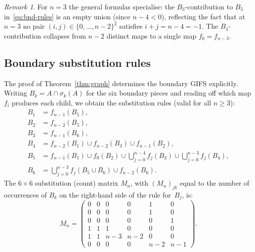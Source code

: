 \documentclass{amsart}
\theoremstyle{definition}
\theoremstyle{remark}
\newtheorem{remark}[theorem]{Remark}
\begin{document}
\begin{remark}
For $n = 3$ the general formulas specialise: the $B_3$-contribution
to $B_5$ in~\eqref{eq:bnd-rules} is an empty union (since
$n - 4 < 0$), reflecting the fact that at $n = 3$ no pair
$(i,j) \in \{0,\ldots,n{-}2\}^2$ satisfies $i + j = n{-}4 = -1$.
The $B_4$-contribution collapses from $n{-}2$ distinct maps to a
single map $f_0 = f_{n-3}$.
\end{remark}

\subsection{Boundary substitution rules}

The proof of Theorem~\ref{thm:graph} determines the boundary GIFS
explicitly.  Writing $B_k = A \cap \sigma_k(A)$ for the six
boundary pieces and reading off which map $f_i$ produces each
child, we obtain the substitution rules (valid for all $n \ge 3$):
\begin{equation}\label{eq:bnd-rules}
\begin{aligned}
  B_1 &= f_{n-1}(B_5), \\
  B_2 &= f_{n-2}(B_5), \\
  B_3 &= f_{n-1}(B_6), \\
  B_4 &= f_{n-2}(B_1) \cup f_{n-2}(B_3) \cup f_{n-1}(B_2), \\
  B_5 &= f_{n-1}(B_1) \cup f_0(B_2)
    \cup \bigcup_{j=0}^{n-4} f_j(B_3)
    \cup \bigcup_{j=0}^{n-3} f_j(B_4), \\
  B_6 &= \bigcup_{j=0}^{n-3} f_j(B_5 \cup B_6) \cup f_{n-2}(B_6).
\end{aligned}
\end{equation}
The $6 \times 6$ substitution (count) matrix $M_n$, with $(M_n)_{jk}$
equal to the number of occurrences of $B_k$ on the right-hand side of
the rule for~$B_j$, is:
\begin{equation}\label{eq:subst-matrix}
  M_n =
  \begin{pmatrix}
    0 & 0 & 0 & 0 & 1 & 0 \\
    0 & 0 & 0 & 0 & 1 & 0 \\
    0 & 0 & 0 & 0 & 0 & 1 \\
    1 & 1 & 1 & 0 & 0 & 0 \\
    1 & 1 & n{-}3 & n{-}2 & 0 & 0 \\
    0 & 0 &   0 &   0 & n{-}2 & n{-}1
  \end{pmatrix}.
\end{equation}
\end{document}
